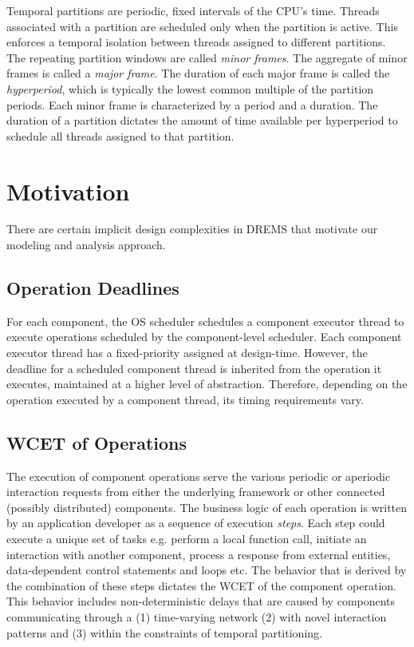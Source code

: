 Temporal partitions are periodic, fixed intervals of the CPU's time. Threads associated with a partition are scheduled only when the partition is active. This enforces a temporal isolation between threads assigned to different partitions. The repeating partition windows are called \emph{minor frames}. The aggregate of minor frames is called a \emph{major frame}. The duration of each major frame is called the \emph{hyperperiod}, which is typically the lowest common multiple of the partition periods. Each minor frame is characterized by a period and a duration. The duration of a partition dictates the amount of time available per hyperperiod to schedule all threads assigned to that partition.

\section{Motivation}
\label{sec:Motivation}

There are certain implicit design complexities in DREMS that motivate our modeling and analysis approach.
\subsection{Operation Deadlines}
\label{subsec:Operation_Deadlines}
For each component, the OS scheduler schedules a component executor thread to execute operations scheduled by the component-level scheduler. Each component executor thread has a fixed-priority assigned at design-time. However, the deadline for a scheduled component thread is inherited from the operation it executes, maintained at a higher level of abstraction. Therefore, depending on the operation executed by a component thread, its timing requirements vary.

\subsection{WCET of Operations}
The execution of component operations serve the various periodic or aperiodic interaction requests from either the underlying framework or other connected (possibly distributed) components. The business logic of each operation is written by an application developer as a sequence of execution \emph{steps}. Each step could execute a unique set of tasks e.g. perform a local function call, initiate an interaction with another component, process a response from external entities,  data-dependent control statements and loops etc. The behavior that is derived by the combination of these steps dictates the WCET of the component operation. This behavior includes non-deterministic delays that are caused by components communicating through a (1) time-varying network (2) with novel interaction patterns and (3) within the constraints of temporal partitioning. 

